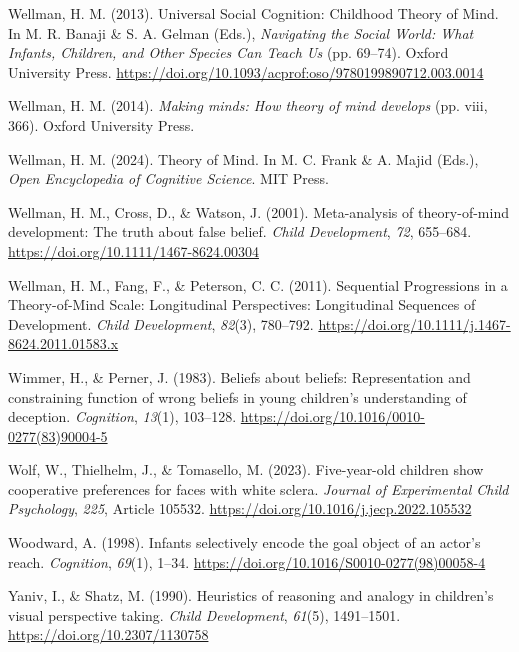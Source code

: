 \documentclass[
]{scrbook}
\newlength{\cslhangindent}
\newenvironment{CSLReferences}[2] %
 {\begin{list}{}{%
  \setlength{\itemindent}{0pt}
  \setlength{\leftmargin}{0pt}
  \setlength{\parsep}{0pt}
  \ifodd #1
   \setlength{\leftmargin}{\cslhangindent}
   \setlength{\itemindent}{-1\cslhangindent}
  \fi
  \setlength{\itemsep}{#2\baselineskip}}}
 {\end{list}}
\begin{document}
\begin{CSLReferences}{1}{0}
Wellman, H. M. (2013). Universal {Social Cognition}: {Childhood Theory} of {Mind}. In M. R. Banaji \& S. A. Gelman (Eds.), \emph{Navigating the {Social World}: {What Infants}, {Children}, and {Other Species Can Teach Us}} (pp. 69--74). Oxford University Press. \url{https://doi.org/10.1093/acprof:oso/9780199890712.003.0014}

Wellman, H. M. (2014). \emph{Making minds: {How} theory of mind develops} (pp. viii, 366). Oxford University Press.

Wellman, H. M. (2024). Theory of {Mind}. In M. C. Frank \& A. Majid (Eds.), \emph{Open {Encyclopedia} of {Cognitive Science}}. MIT Press.

Wellman, H. M., Cross, D., \& Watson, J. (2001). Meta-analysis of theory-of-mind development: {The} truth about false belief. \emph{Child Development}, \emph{72}, 655--684. \url{https://doi.org/10.1111/1467-8624.00304}

Wellman, H. M., Fang, F., \& Peterson, C. C. (2011). Sequential {Progressions} in a {Theory-of-Mind Scale}: {Longitudinal Perspectives}: {Longitudinal Sequences} of {Development}. \emph{Child Development}, \emph{82}(3), 780--792. \url{https://doi.org/10.1111/j.1467-8624.2011.01583.x}

Wimmer, H., \& Perner, J. (1983). Beliefs about beliefs: {Representation} and constraining function of wrong beliefs in young children's understanding of deception. \emph{Cognition}, \emph{13}(1), 103--128. \url{https://doi.org/10.1016/0010-0277(83)90004-5}

Wolf, W., Thielhelm, J., \& Tomasello, M. (2023). Five-year-old children show cooperative preferences for faces with white sclera. \emph{Journal of Experimental Child Psychology}, \emph{225}, Article 105532. \url{https://doi.org/10.1016/j.jecp.2022.105532}

Woodward, A. (1998). Infants selectively encode the goal object of an actor's reach. \emph{Cognition}, \emph{69}(1), 1--34. \url{https://doi.org/10.1016/S0010-0277(98)00058-4}

Yaniv, I., \& Shatz, M. (1990). Heuristics of reasoning and analogy in children's visual perspective taking. \emph{Child Development}, \emph{61}(5), 1491--1501. \url{https://doi.org/10.2307/1130758}


\end{CSLReferences}
\end{document}
